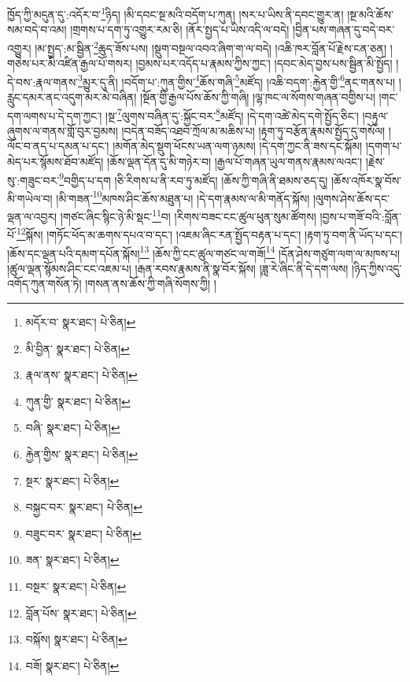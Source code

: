 ཁྱོད་ཀྱི་མདུན་དུ་:འདོར་བ་\footnote{མདོར་བ་  སྣར་ཐང་།  པེ་ཅིན། }ཉིད། །མི་དབང་སྔ་མའི་བདོག་པ་ཀུན། །སར་པ་ཡིས་ནི་དབང་གྱུར་ན། །སྔ་མའི་ཆོས་སམ་བདེ་བ་འམ། །གྲགས་པ་དག་ཏུ་འགྱུར་རམ་ཅི། །ནོར་སྤྱད་པ་ཡིས་འདི་ལ་བདེ། །བྱིན་པས་གཞན་དུ་བདེ་བར་འགྱུར། །མ་སྤྱད་:མ་སྦྱིན་\footnote{མི་བྱིན་  སྣར་ཐང་།  པེ་ཅིན། }ཆུད་ཟོས་པས། །སྡུག་བསྔལ་འབའ་ཞིག་ག་ལ་བདེ། །འཆི་ཁར་བློན་པོ་རྗེས་ངན་ཅན། །གཅེས་པར་མི་འཛིན་རྒྱལ་པོ་གསར། །བྱམས་པར་འདོད་པ་རྣམས་ཀྱིས་ཀྱང་། །དབང་མེད་བྱས་པས་སྦྱིན་མི་སྤྱོད། །དེ་བས་:རྣལ་གནས་\footnote{རྣལ་ནས་  སྣར་ཐང་།  པེ་ཅིན། }མྱུར་དུ་ནི། །བདོག་པ་:ཀུན་གྱིས་\footnote{ཀུན་གྱི་  སྣར་ཐང་།  པེ་ཅིན། }ཆོས་གཞི་\footnote{བཞི་  སྣར་ཐང་།  པེ་ཅིན། }མཛོད། །འཆི་བདག་:རྐྱེན་གྱི་\footnote{རྐྱེན་གྱིས་  སྣར་ཐང་།  པེ་ཅིན། }ནང་གནས་པ། །རླུང་དམར་ནང་འདུག་མར་མེ་བཞིན། །སྔོན་གྱི་རྒྱལ་པོས་ཆོས་ཀྱི་གཞི། །ལྷ་ཁང་ལ་སོགས་གཞན་བགྱིས་པ། །གང་དག་ལགས་པ་དེ་དག་ཀྱང་། །སྔ་\footnote{སྔར་  སྣར་ཐང་།  པེ་ཅིན། }ལུགས་བཞིན་དུ་:སྐྱོང་བར་\footnote{བསྐྱང་བར་  སྣར་ཐང་།  པེ་ཅིན། }མཛོད། །དེ་དག་འཚེ་མེད་དགེ་སྤྱོད་ཅིང་། །བརྟུལ་ཞུགས་ལ་གནས་གློ་བུར་བྱམས། །བདེན་བཟོད་འཐབ་ཀྲོལ་མ་མཆིས་པ། །རྟག་ཏུ་བརྩོན་རྣམས་སྤྱོད་དུ་གསོལ། །ལོང་བ་ནད་པ་དམན་པ་དང་། །མགོན་མེད་སྡུག་ཕོངས་ཡན་ལག་ཉམས། །དེ་དག་ཀྱང་ནི་ཟས་དང་སྐོམ། །དགག་པ་མེད་པར་སྙོམས་ཐོབ་མཛོད། །ཆོས་ལྡན་དོན་དུ་མི་གཉེར་བ། །རྒྱལ་པོ་གཞན་ཡུལ་གནས་རྣམས་ལའང་། །རྗེས་སུ་:གཟུང་བར་\footnote{བཟུང་བར་  སྣར་ཐང་།  པེ་ཅིན། }བགྱིད་པ་དག །ཅི་རིགས་པ་ནི་རབ་ཏུ་མཛོད། །ཆོས་ཀྱི་གཞི་ནི་ཐམས་ཅད་དུ། །ཆོས་འཁོར་སྣ་བོས་མི་གཡེལ་བ། །མི་གཟན་\footnote{ཟན་  སྣར་ཐང་།  པེ་ཅིན། }མཁས་ཤིང་ཆོས་མཐུན་པ། །དེ་དག་རྣམས་ལ་མི་གནོད་སྐོས། །ལུགས་ཤེས་ཆོས་དང་ལྡན་ལ་འབྱར། །གཙང་ཞིང་སྙིང་ཉེ་མི་སྡང་\footnote{བསྔར་  སྣར་ཐང་།  པེ་ཅིན། }བ། །རིགས་བཟང་ངང་ཚུལ་ཕུན་སུམ་ཚོགས། །བྱས་པ་གཟོ་བའི་:བློན་པོ་\footnote{བློན་པོས་  སྣར་ཐང་།  པེ་ཅིན། }སྐོས། །གཏོང་ཕོད་མ་ཆགས་དཔའ་བ་དང་། །འཇམ་ཞིང་རན་སྤྱོད་བརྟན་པ་དང་། །རྟག་ཏུ་བག་ནི་ཡོད་པ་དང་། །ཆོས་དང་ལྡན་པའི་དམག་དཔོན་སྐོས།\footnote{བསྐོས།  སྣར་ཐང་།  པེ་ཅིན། } །ཆོས་ཀྱི་ངང་ཚུལ་གཙང་ལ་གཟོ།\footnote{བཟོ།  སྣར་ཐང་།  པེ་ཅིན། } །དོན་ཤེས་གཙུག་ལག་ལ་མཁས་པ། །ཚུལ་ལྡན་སྙོམས་ཤིང་ངང་འཇམ་པ། །རྒན་རབས་རྣམས་ནི་སྣ་བོར་སྐོས། །ཟླ་རེ་ཞིང་ནི་དེ་དག་ལས། །ཉིད་ཀྱིས་འདུ་འགོད་ཀུན་གསོན་ཏེ། །གསན་ནས་ཆོས་ཀྱི་གཞི་སོགས་ཀྱི། །
